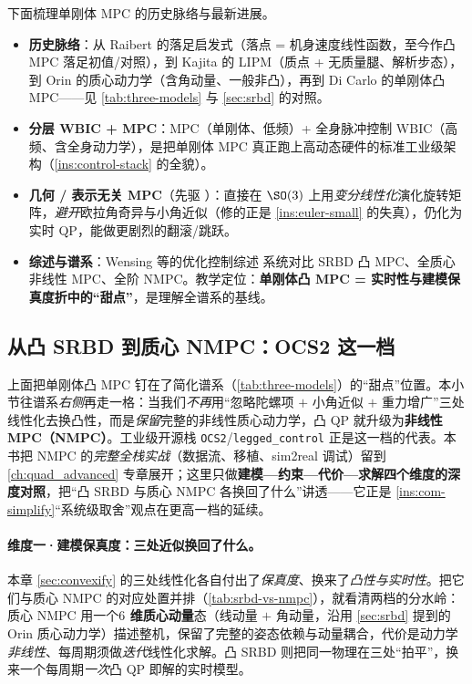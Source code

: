 \noindent 下面梳理单刚体 MPC 的历史脉络与最新进展。
\begin{itemize}
  \item \textbf{历史脉络}：从 Raibert 的落足启发式\cite{raibert1986legged}（落点 = 机身速度线性函数，至今作凸 MPC 落足初值/对照），到 Kajita 的 LIPM\cite{kajita2001lipm}（质点 + 无质量腿、解析步态），到 Orin 的质心动力学\cite{orin2013centroidal}（含角动量、一般非凸），再到 Di Carlo 的单刚体凸 MPC\cite{dicarlo2018cheetah}——见 \cref{tab:three-models} 与 \cref{sec:srbd} 的对照。
  \item \textbf{分层 WBIC + MPC}\cite{kim2019wbic}：MPC（单刚体、低频）+ 全身脉冲控制 WBIC（高频、含全身动力学），是把单刚体 MPC 真正跑上高动态硬件的标准工业级架构（\cref{ins:control-stack} 的全貌）。
  \item \textbf{几何 / 表示无关 MPC}\cite{ding2021repfree}（先驱 \cite{ding2019realtime}）：直接在 $\SO(3)$ 上用\emph{变分线性化}演化旋转矩阵，\emph{避开}欧拉角奇异与小角近似（修的正是 \cref{ins:euler-small} 的失真），仍化为实时 QP，能做更剧烈的翻滚/跳跃。
  \item \textbf{综述与谱系}：Wensing 等的优化控制综述\cite{wensing2024legged} 系统对比 SRBD 凸 MPC、全质心非线性 MPC、全阶 NMPC。教学定位：\textbf{单刚体凸 MPC = 实时性与建模保真度折中的“甜点”}，是理解全谱系的基线。
\end{itemize}

\subsection{从凸 SRBD 到质心 NMPC：OCS2 这一档}
\label{subsec:mpc-nmpc}

上面把单刚体凸 MPC 钉在了简化谱系（\cref{tab:three-models}）的“甜点”位置。本小节往谱系\emph{右侧}再走一格：当我们\emph{不再}用“忽略陀螺项 $+$ 小角近似 $+$ 重力增广”三处线性化去换凸性，而是\emph{保留}完整的非线性质心动力学，凸 QP 就升级为\textbf{非线性 MPC（NMPC）}。工业级开源栈 \texttt{OCS2}/\texttt{legged\_control}\cite{grandia2022perceptive,sleiman2021unified} 正是这一档的代表。本书把 NMPC 的\emph{完整全栈实战}（数据流、移植、sim2real 调试）留到 \cref{ch:quad_advanced} 专章展开；这里只做\textbf{建模—约束—代价—求解四个维度的深度对照}，把“凸 SRBD 与质心 NMPC 各换回了什么”讲透——它正是 \cref{ins:com-simplify}“系统级取舍”观点在更高一档的延续。

\paragraph{维度一·建模保真度：三处近似换回了什么。}
本章 \cref{sec:convexify} 的三处线性化各自付出了\emph{保真度}、换来了\emph{凸性与实时性}。把它们与质心 NMPC 的对应处置并排（\cref{tab:srbd-vs-nmpc}），就看清两档的分水岭：质心 NMPC 用一个\textbf{$6$ 维质心动量}态（线动量 $+$ 角动量，沿用 \cref{sec:srbd} 提到的 Orin 质心动力学\cite{orin2013centroidal}）描述整机，保留了完整的姿态依赖与动量耦合，代价是动力学\emph{非线性}、每周期须做\emph{迭代}线性化求解。凸 SRBD 则把同一物理在三处“拍平”，换来一个每周期\emph{一次}凸 QP 即解的实时模型。

